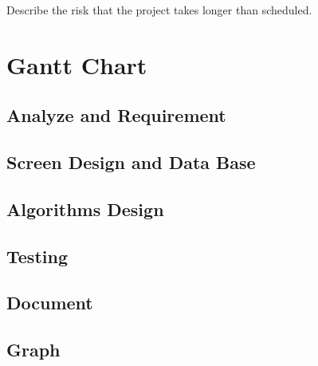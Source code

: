 Describe the risk that the project takes longer than scheduled.

\section{Gantt Chart}

\subsection{Analyze and Requirement}

\subsection{Screen Design and Data Base}

\subsection{Algorithms Design}

\subsection{Testing}

\subsection{Document}

\subsection{Graph}